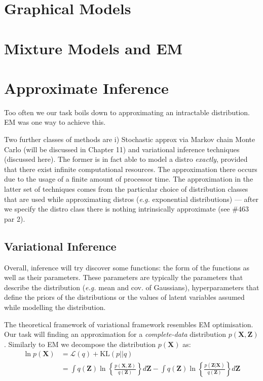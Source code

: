 \documentclass[a4paper]{article}
\newcommand{\eg}{\textit{e.g. }}
\newcommand{\mb}{\mathbf}
\begin{document}
\section{Graphical Models}
\section{Mixture Models and EM}






\newpage
\clearpage

\section{Approximate Inference}
Too often we our task boils down to approximating an intractable distribution. EM was one way to achieve this.

Two further classes of methods are i) Stochastic approx via Markov chain Monte Carlo (will be discussed in Chapter 11) and variational inference techniques (discussed here). The former is in fact able to model a distro \textit{exactly}, provided that there exist infinite computational resources. The approximation there occurs due to the usage of a finite amount of processor time. The approximation in the latter set of techniques comes from the particular choice of distribution classes that are used while approximating distros (\eg exponential distributions) \---- after we specify the distro class there is nothing intrinsically approximate (see \#463 par 2).

\subsection{Variational Inference}
Overall, inference will try discover some functions: the form of the functions as well as their parameters. These parameters are typically the parameters that describe the distribution (\eg mean and cov. of Gaussians), hyperparameters that define the priors of the distributions or the values of latent variables assumed while modelling the distribution. 	

The theoretical framework of variational framework resembles EM optimisation. Our task will finding an approximation for a \textit{complete-data} distribution $p(\mb{X,Z})$. Similarly to EM we decompose the distribution $p(\mb{X})$ as:
%
\begin{align}
\ln p(\mb{X}) &= \mathcal{L}(q)+\text{KL}(p||q) \label{eq:decomp}\\
 &= \int q(\mb{Z})\ln \left\{\frac{p(\mb{X,Z})}{q(\mb{Z})}\right\}d\mb{Z} - 
 \int q(\mb{Z})\ln \left\{\frac{p(\mb{Z|X})}{q(\mb{Z})}\right\}d\mb{Z}
\end{align}
\end{document}
